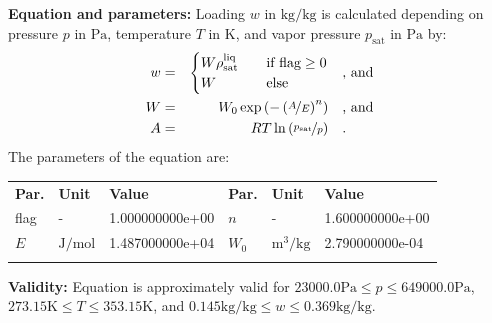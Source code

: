\textbf{Equation and parameters:}
\newline
%
Loading $w$ in $\si{\kilogram\per\kilogram}$ is calculated depending on pressure $p$ in $\si{\pascal}$, temperature $T$ in $\si{\kelvin}$, and vapor pressure $p_\mathrm{sat}$ in $\si{\pascal}$ by:
%
\begin{equation*}
\begin{split}
w &=& \begin{cases} W \rho_\mathrm{sat}^{\mathrm{liq}} & \quad \text{if flag} \geq 0 \\ W & \quad \text{else} \end{cases} & \quad\text{, and} \\
W &=& W_0 \exp \left( - \left( \nicefrac{A}{E} \right) ^{n} \right) & \quad\text{, and} \\
A &=& R T \ln \left( \nicefrac{p_\mathrm{sat}}{p} \right) & \quad\text{.} \\
\end{split}
\end{equation*}
%
The parameters of the equation are:
%
\begin{longtable}[l]{lll|lll}
\toprule
\addlinespace
\textbf{Par.} & \textbf{Unit} & \textbf{Value} &	\textbf{Par.} & \textbf{Unit} & \textbf{Value} \\
\addlinespace
\midrule
\endhead

\bottomrule
\endfoot
\bottomrule
\endlastfoot
\addlinespace

flag & - & 1.000000000e+00 & $n$ & - & 1.600000000e+00 \\
$E$ & $\si{\joule\per\mole}$ & 1.487000000e+04 & $W_0$ & $\si{\cubic\meter\per\kilogram}$ & 2.790000000e-04 \\

\addlinespace\end{longtable}

\textbf{Validity:}
\newline
Equation is approximately valid for $23000.0 \si{\pascal} \leq p \leq 649000.0 \si{\pascal}$,  $273.15 \si{\kelvin} \leq T \leq 353.15 \si{\kelvin}$, and $0.145 \si{\kilogram\per\kilogram} \leq w \leq 0.369 \si{\kilogram\per\kilogram}$.
\newline

